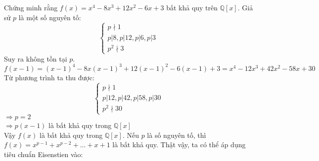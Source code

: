 \documentclass[a5paper,12pt]{report}%
\theoremstyle{definition}
\begin{document}
\vd Chứng minh rằng $f(x)=x^4-8x^3+12x^2-6x+3$ bất khả quy trên $\mathbb Q[x]$.
Giả sử $p$ là một số nguyên tố:
$$\begin{cases}
	p \nmid 1\\
	p | 8,p| 12,p| 6,p| 3\\
	p^2 \nmid 3
\end{cases}$$
Suy ra không tồn tại $p$.
\[f(x-1)=(x-1)^4-8x(x-1)^3+12(x-1)^2-6(x-1)+3=x^4-12x^3+42x^2-58x+30\]
Từ phương trình ta thu được:
$$\begin{cases}
	p \nmid 1 \\
	p |12,p|42,p|58,p|30 \\
	p^2 \nmid 30
\end{cases}$$
$\Rightarrow p=2$\\
$\Rightarrow p(x-1)$ là bất khả quy trong $\mathbb Q[x]$\\
Vậy $f(x)$ là bất khả quy trong $\mathbb Q[x]$.
\vd Nếu $p$ là số nguyên tố, thì $f(x)=x^{p-1} +x^{p-2}+...+x+1$ là bất khả quy.
Thật vậy, ta có thể áp dụng tiêu chuẩn Eisenstien vào:
	
\end{document}

